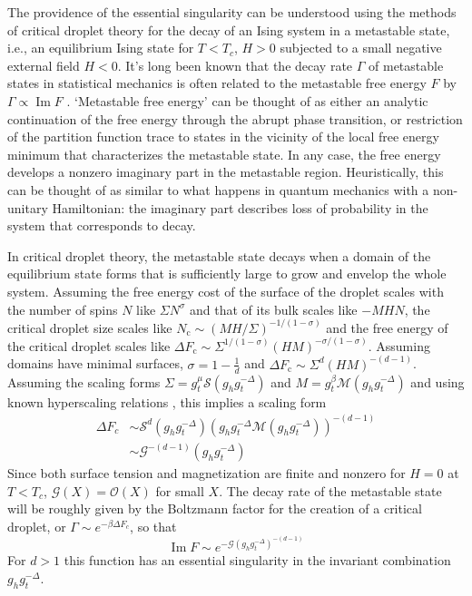 \documentclass[aps,prl,reprint,fleqn]{revtex4-1}
\def\[{\begin{equation}}
\def\]{\end{equation}}
\def\im{\mathop{\mathrm{Im}}\nolimits}
\def\O{\mathcal O}
\def\c{\mathrm c}
\begin{document}
The providence of the essential singularity can be understood using the
methods of critical droplet theory for the decay of an Ising system in a
metastable state, i.e., an equilibrium Ising state for $T<T_c$, $H>0$
subjected to a small negative external field $H<0$.
It's long been known that the decay rate $\Gamma$ of metastable states in
statistical mechanics is often related to the metastable free energy $F$ by
$\Gamma\propto\im F$
\cite{langer.1967.condensation,langer.1969.metastable,gaveau.1989.analytic}.
`Metastable free energy' can be thought of as either an analytic continuation of the free energy
through the abrupt phase transition, or restriction of the partition function
trace to states in the vicinity of the local free energy minimum that
characterizes the metastable state. In any case, the free energy develops a
nonzero imaginary part in the metastable region. Heuristically, this can be
thought of as similar to what happens in quantum mechanics with a non-unitary
Hamiltonian: the imaginary part describes loss of probability in the system
that corresponds to decay. 

In critical droplet theory, the metastable state decays when a domain of the
equilibrium state forms that is sufficiently large to grow and envelop the
whole system. Assuming the free energy cost of the surface of the droplet
scales with the number of spins $N$ like $\Sigma N^\sigma$ and that of its
bulk scales like $-MHN$, the critical droplet size scales like
$N_\c\sim(MH/\Sigma)^{-1/(1-\sigma)}$ and the free energy of the critical
droplet scales like $\Delta F_\c\sim\Sigma^{1/(1-\sigma)}(HM)^{-\sigma/(1-\sigma)}$.
Assuming domains have minimal surfaces, $\sigma=1-\frac1d$ and
$\Delta F_\c\sim\Sigma^d(HM)^{-(d-1)}$. Assuming the scaling forms
$\Sigma=g_t^\mu\mathcal S(g_hg_t^{-\Delta})$ and $M=g_t^\beta\mathcal
M(g_hg_t^{-\Delta})$ and using known hyperscaling relations
\cite{widom.1981.interface}, this implies a scaling form
\begin{align}
  \Delta F_c&
  \sim\mathcal S^d(g_hg_t^{-\Delta})(g_hg_t^{-\Delta}\mathcal
    M(g_hg_t^{-\Delta}))^{-(d-1)}\\
  &\sim\mathcal G^{-(d-1)}(g_h g_t^{-\Delta})
\end{align}
Since both surface tension and magnetization are finite and nonzero for $H=0$
at $T<T_c$, $\mathcal G(X)=\O(X)$ for small $X$.
The decay rate of the metastable state will be roughly given by the Boltzmann
factor for the creation of a critical droplet, or $\Gamma\sim e^{-\beta\Delta
F_c}$, so that
\[
  \im F\sim e^{-\mathcal G(g_hg_t^{-\Delta})^{-(d-1)}}
\]
For $d>1$ this function has an essential singularity in the invariant
combination $g_hg_t^{-\Delta}$.
\end{document}
